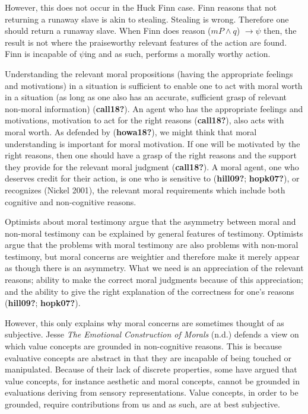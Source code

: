 \documentclass[12pt]{book}
\theoremstyle{definition}
\theoremstyle{remark}
\begin{document}
However, this does not occur in the Huck Finn case. Finn reasons that not returning a runaway slave is akin to stealing. Stealing is wrong. Therefore one should return a runaway slave. When Finn does reason (\(mP \land q\)) \(\rightarrow \psi\) then, the result is not where the praiseworthy relevant features of the action are found. Finn is incapable of \(\psi\)ing and as such, performs a morally worthy action.

Understanding the relevant moral propositions (having the appropriate feelings and motivations) in a situation is sufficient to enable one to act with moral worth in a situation (as long as one also has an accurate, sufficient grasp of relevant non-moral information) (\textbf{call18?}). An agent who has the appropriate feelings and motivations, motivation to act for the right reasons (\textbf{call18?}), also acts with moral worth. As defended by (\textbf{howa18?}), we might think that moral understanding is important for moral motivation. If one will be motivated by the right reasons, then one should have a grasp of the right reasons and the support they provide for the relevant moral judgment (\textbf{call18?}). A moral agent, one who deserves credit for their action, is one who is sensitive to (\textbf{hill09?}; \textbf{hopk07?}), or recognizes (Nickel 2001), the relevant moral requirements which include both cognitive and non-cognitive reasons.

Optimists about moral testimony argue that the asymmetry between moral and non-moral testimony can be explained by general features of testimony. Optimists argue that the problems with moral testimony are also problems with non-moral testimony, but moral concerns are weightier and therefore make it merely appear as though there is an asymmetry. What we need is an appreciation of the relevant reasons; ability to make the correct moral judgments because of this appreciation; and the ability to give the right explanation of the correctness for one's reasons (\textbf{hill09?}; \textbf{hopk07?}).

However, this only explains why moral concerns are sometimes thought of as subjective. Jesse \emph{The {Emotional Construction} of {Morals}} (n.d.) defends a view on which value concepts are grounded in non-cognitive reasons. This is because evaluative concepts are abstract in that they are incapable of being touched or manipulated. Because of their lack of discrete properties, some have argued that value concepts, for instance aesthetic and moral concepts, cannot be grounded in evaluations deriving from sensory representations. Value concepts, in order to be grounded, require contributions from us and as such, are at best subjective.
\end{document}
